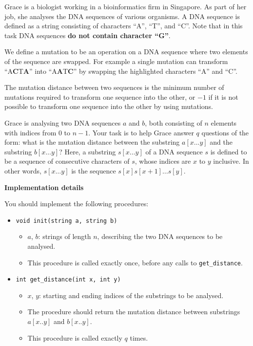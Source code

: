 Grace is a biologist working in a bioinformatics firm in Singapore. As part of her job, she analyses the
DNA sequences of various organisms. A DNA sequence is defined as a string consisting of
characters ``A'', ``T'', and ``C''. Note that in this task DNA sequences \textbf{do not contain character ``G''}.

We define a mutation to be an operation on a DNA sequence where two elements of the sequence
are swapped. For example a single mutation can transform ``A\textbf{C}T\textbf{A}'' into ``A\textbf{A}T\textbf{C}'' by swapping the
highlighted characters ``A'' and ``C''.

The mutation distance between two sequences is the minimum number of mutations required to
transform one sequence into the other, or $-1$ if it is not possible to transform one sequence into the
other by using mutations.

Grace is analysing two DNA sequences $a$ and $b$, both consisting of $n$ elements with indices from $0$ to $n - 1$. Your task is to help Grace answer $q$ questions of the form: what is the mutation distance between the substring $a[x\ldots y]$ and the substring $b[x\ldots y]$? Here, a substring $s[x\ldots y]$ of a DNA
sequence $s$ is defined to be a sequence of consecutive characters of $s$, whose indices are $x$ to $y$
inclusive. In other words, $s[x\ldots y]$ is the sequence $s[x]s[x+1]\ldots s[y]$.

\textbf{Implementation details}

You should implement the following procedures:

\begin{itemize}
\item \texttt{void init(string a, string b)}
\begin{itemize}

\item $a$, $b$: strings of length $n$, describing the two DNA sequences to be analysed.
\item This procedure is called exactly once, before any calls to \texttt{get\_distance}.
\end{itemize}

\item \texttt{int get\_distance(int x, int y)}
\begin{itemize}
\item $x$, $y$: starting and ending indices of the substrings to be analysed.
\item The procedure should return the mutation distance between substrings $a[x..y]$ and $b[x..y]$.
\item This procedure is called exactly $q$ times.
\end{itemize}
\end{itemize}